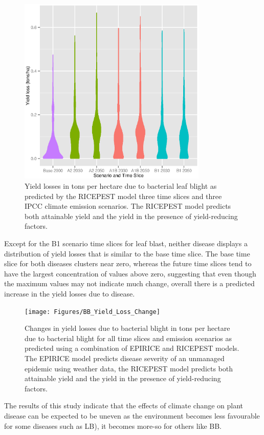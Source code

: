 \documentclass[preprint,12pt]{elsarticle}
\begin{document}
\begin{figure}[H]
  \includegraphics[width = 90mm]{Figures/BB_Losses_Violin}
  \caption{Yield losses in tons per hectare due to bacterial leaf blight as predicted by the RICEPEST model three time slices and three IPCC climate emission scenarios. The RICEPEST model predicts both attainable yield and the yield in the presence of yield-reducing factors.}
  \label{BB_Losses_Violin}
\end{figure}

Except for the B1 scenario time slices for leaf blast, neither disease displays a distribution of yield losses that is similar to the base time slice. The base time slice for both diseases clusters near zero, whereas the future time slices tend to have the largest concentration of values above zero, suggesting that even though the maximum values may not indicate much change, overall there is a predicted increase in the yield losses due to disease.

\begin{figure}[H]
  \texttt{[image: Figures/BB\_Yield\_Loss\_Change]}
  \caption{Changes in yield losses due to bacterial blight  in tons per hectare due to bacterial blight for all time slices and emission scenarios as predicted using a combination of EPIRICE and RICEPEST models. The EPIRICE model predicts disease severity of an unmanaged epidemic using weather data, the RICEPEST model predicts both attainable yield and the yield in the presence of yield-reducing factors.}
  \label{BB_Change_Map}
\end{figure}

The results of this study indicate that the effects of climate change on plant disease can be expected to be uneven as the environment becomes less favourable for some diseases such as LB), it becomes more-so for others like BB. 
\end{document}
